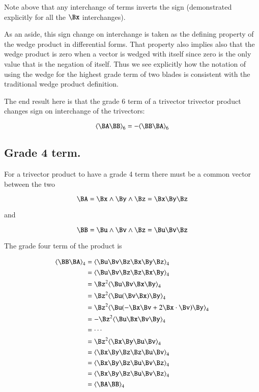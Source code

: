 Note above that any interchange of terms inverts the sign (demonstrated 
explicitly for all the $\Bx$ interchanges).

As an aside, this
sign change on interchange is taken as the defining property of the 
wedge product in differential forms.  That property also
implies also that the wedge product is
zero when a vector is wedged with itself since zero is the only
value that is the negation of itself.  Thus we see explicitly
how the notation of using the wedge for the highest grade term
of two blades is consistent with the traditional
wedge product definition.

The end result here is that the grade 6 term of a trivector trivector product
changes sign on interchange of the trivectors:

\begin{equation}\label{eqn:trivector:trivecgpgrade6}
\gpgrade{\BA\BB}{6} = -\gpgrade{\BB\BA}{6}
\end{equation}

\subsection{Grade 4 term. }

For a trivector product to have a grade 4 term there must be a common
vector between the two

\[
\BA = \Bx \wedge \By \wedge \Bz = \Bx\By\Bz
\]

and

\[
\BB = \Bu \wedge \Bv \wedge \Bz =\Bu\Bv\Bz
\]

The grade four term of the product is

\begin{align*}
\gpgrade{\BB \BA}{4}
&= \gpgrade{ \Bu\Bv\Bz \Bx\By\Bz }{4} \\
&= \gpgrade{ \Bu\Bv\Bz \Bz\Bx\By }{4} \\
&= \Bz^2\gpgrade{ \Bu\Bv\Bx\By }{4} \\
&= \Bz^2\gpgrade{ \Bu(\Bv\Bx)\By }{4} \\
&= \Bz^2\gpgrade{ \Bu(-\Bx\Bv + 2 \Bx \cdot \Bv)\By }{4} \\
&= -\Bz^2\gpgrade{ \Bu\Bx\Bv\By }{4} \\
&= \cdots \\
&= \Bz^2\gpgrade{ \Bx\By\Bu\Bv }{4} \\
&= \gpgrade{ \Bx\By\Bz\Bz\Bu\Bv }{4} \\
&= \gpgrade{ \Bx\By\Bz\Bu\Bv\Bz }{4} \\
&= \gpgrade{ \Bx\By\Bz\Bu\Bv\Bz }{4} \\
&= \gpgrade{\BA \BB}{4}
\end{align*}

